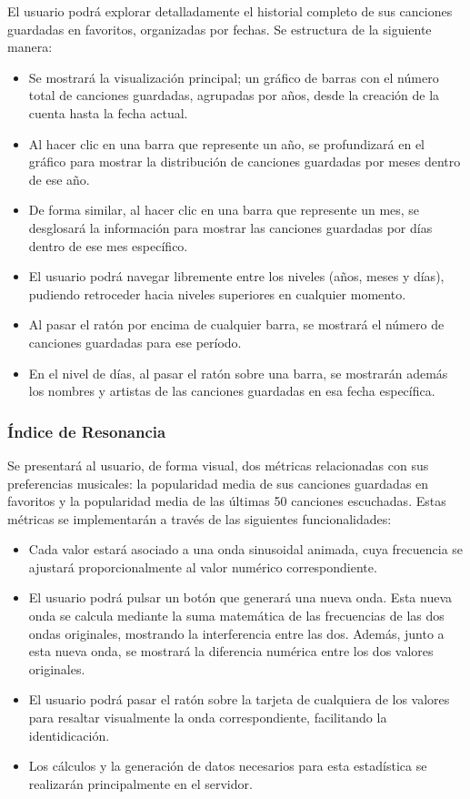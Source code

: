 El usuario podrá explorar detalladamente el historial completo de sus canciones guardadas en favoritos, organizadas por fechas. Se estructura de la siguiente manera:
\begin{itemize}
    \item Se mostrará la visualización principal; un gráfico de barras con el número total de canciones guardadas, agrupadas por años, desde la creación de la cuenta hasta la fecha actual.
    \item Al hacer clic en una barra que represente un año, se profundizará en el gráfico para mostrar la distribución de canciones guardadas por meses dentro de ese año.
    \item De forma similar, al hacer clic en una barra que represente un mes, se desglosará la información para mostrar las canciones guardadas por días dentro de ese mes específico.
    \item El usuario podrá navegar libremente entre los niveles (años, meses y días), pudiendo retroceder hacia niveles superiores en cualquier momento.
    \item Al pasar el ratón por encima de cualquier barra, se mostrará el número de canciones guardadas para ese período.
    \item En el nivel de días, al pasar el ratón sobre una barra, se mostrarán además los nombres y artistas de las canciones guardadas en esa fecha específica.
\end{itemize}


\subsubsection*{Índice de Resonancia}

Se presentará al usuario, de forma visual, dos métricas relacionadas con sus preferencias musicales: la popularidad media de sus canciones guardadas en favoritos y la popularidad media de las últimas 50 canciones escuchadas. Estas métricas se implementarán a través de las siguientes funcionalidades:
\begin{itemize}
    \item Cada valor estará asociado a una onda sinusoidal animada, cuya frecuencia se ajustará proporcionalmente al valor numérico correspondiente.
    \item El usuario podrá pulsar un botón que generará una nueva onda. Esta nueva onda se calcula mediante la suma matemática de las frecuencias de las dos ondas originales, mostrando la interferencia entre las dos. Además, junto a esta nueva onda, se mostrará la diferencia numérica entre los dos valores originales.
    \item El usuario podrá pasar el ratón sobre la tarjeta de cualquiera de los valores para resaltar visualmente la onda correspondiente, facilitando la identidicación.
    \item Los cálculos y la generación de datos necesarios para esta estadística se realizarán principalmente en el servidor.
\end{itemize}

